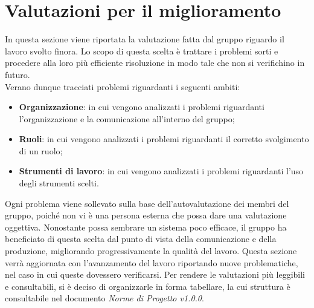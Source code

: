 \section{Valutazioni per il miglioramento}
In questa sezione viene riportata la valutazione fatta dal gruppo riguardo il 
lavoro svolto finora. Lo scopo di questa scelta è trattare i problemi sorti e
procedere alla loro più efficiente risoluzione in modo tale che non si verifichino
in futuro. \\
Verano dunque tracciati problemi riguardanti i seguenti ambiti:

\begin{itemize}
	\item \textbf{Organizzazione}: in cui vengono analizzati i problemi riguardanti 
		l'organizzazione e la comunicazione all'interno del gruppo;
	\item \textbf{Ruoli}: in cui vengono analizzati i problemi riguardanti il 
		corretto svolgimento di un ruolo;
	\item \textbf{Strumenti di lavoro}: in cui vengono analizzati i problemi riguardanti 
		l'uso degli strumenti scelti.
\end{itemize}

\noindent Ogni problema viene sollevato sulla base dell'autovalutazione dei membri del 
gruppo, poiché non vi è una persona esterna che possa dare una valutazione
oggettiva. Nonostante possa sembrare un sistema poco efficace, il gruppo ha 
beneficiato di questa scelta dal punto di vista della comunicazione e della produzione, migliorando progressivamente la qualità del lavoro.
Questa sezione verrà aggiornata con l'avanzamento del lavoro riportando nuove 
problematiche, nel caso in cui queste dovessero verificarsi.
Per rendere le valutazioni più leggibili e consultabili, si è
deciso di organizzarle in forma tabellare, la cui struttura è 
consultabile nel documento \textit{Norme di Progetto v1.0.0}.

